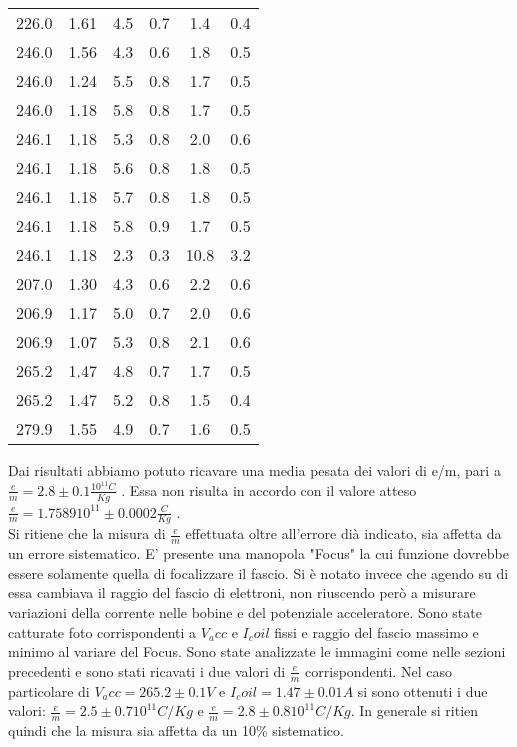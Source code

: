 \begin{table}[h]
\begin{tabular}{*{6}{S[table-figures-exponent = 2]} }
		226.0 & 1.61 & 4.5 & 0.7 & 1.4 & 0.4\\ 
		246.0 & 1.56 & 4.3 & 0.6 & 1.8 & 0.5\\ 
		246.0 & 1.24 & 5.5 & 0.8 & 1.7 & 0.5\\ 
		246.0 & 1.18 & 5.8 & 0.8 & 1.7 & 0.5\\ 
		246.1 & 1.18 & 5.3 & 0.8 & 2.0 & 0.6\\ 
		246.1 & 1.18 & 5.6 & 0.8 & 1.8 & 0.5\\ 
		246.1 & 1.18 & 5.7 & 0.8 & 1.8 & 0.5\\ 
		246.1 & 1.18 & 5.8 & 0.9 & 1.7 & 0.5\\ 
		246.1 & 1.18 & 2.3 & 0.3 & 10.8 & 3.2\\ 
		207.0 & 1.30 & 4.3 & 0.6 & 2.2 & 0.6\\ 
		206.9 & 1.17 & 5.0 & 0.7 & 2.0 & 0.6\\ 
		206.9 & 1.07 & 5.3 & 0.8 & 2.1 & 0.6\\ 
		265.2 & 1.47 & 4.8 & 0.7 & 1.7 & 0.5\\ 
		265.2 & 1.47 & 5.2 & 0.8 & 1.5 & 0.4\\ 
		279.9 & 1.55 & 4.9 & 0.7 & 1.6 & 0.5\\ 
  
 	\end{tabular}
	\caption{ }
	\label{t:tabella2}
\end{table}
Dai risultati abbiamo potuto ricavare una media pesata dei valori di e/m, pari a $\frac{e}{m} = 2.8 \pm 0.1 \frac{10^{11} C}{Kg}$ . Essa non risulta in accordo con il valore atteso $\frac{e}{m} = 1.7589 10^{11} \pm 0.0002 \frac{C}{Kg}$ .\\
Si ritiene che la misura di $\frac{e}{m}$ effettuata oltre all'errore dià indicato, sia affetta da un errore sistematico. E' presente una manopola "Focus" la cui funzione dovrebbe essere solamente quella di focalizzare il fascio. Si è notato invece che agendo su di essa cambiava il raggio del fascio di elettroni, non riuscendo però a misurare variazioni della corrente nelle bobine e del potenziale acceleratore. Sono state catturate foto corrispondenti a $V_acc$ e $I_coil$ fissi e raggio del fascio massimo e minimo al variare del Focus. Sono state analizzate le immagini come nelle sezioni precedenti e sono stati ricavati i due valori di $\frac{e}{m}$ corrispondenti. Nel caso particolare di $V_acc =265.2 \pm 0.1 V$ e $I_coil=1.47 \pm 0.01 A$  si sono ottenuti i due valori: $\frac{e}{m}=2.5 \pm 0.7 10^{11} C/Kg$ e $\frac{e}{m}=2.8 \pm 0.8 10^{11} C/Kg$. In generale si ritien quindi che la misura sia affetta da un 10\% sistematico.\\

